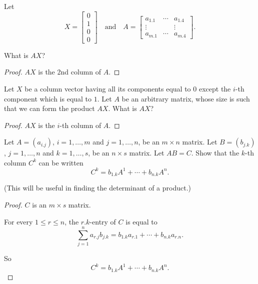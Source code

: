 \begin{exercise}
    Let
    \[
        X = \begin{bmatrix}0 \\ 1 \\ 0 \\ 0\end{bmatrix}
        \quad\text{and}\quad
        A = \begin{bmatrix}
            a_{1.1} & \cdots & a_{1.4} \\
            \vdots  &        & \vdots  \\
            a_{m.1} & \cdots & a_{m.4}
        \end{bmatrix}.
    \]

    What is $AX$?
\end{exercise}

\begin{proof}
    $AX$ is the 2nd column of $A$.
\end{proof}

\begin{exercise}
    Let $X$ be a column vector having all its components equal to $0$ except the $i$-th component which is equal to $1$. Let $A$ be an arbitrary matrix, whose size is such that we can form the product $AX$. What is $AX$?
\end{exercise}

\begin{proof}
    $AX$ is the $i$-th column of $A$.
\end{proof}

\begin{exercise}
    Let $A = {(a_{i.j})}$, $i = 1,\ldots, m$ and $j = 1,\ldots, n$, be an $m\times n$ matrix. Let $B = {(b_{j.k})}$, $j = 1,\ldots, n$ and $k = 1,\ldots, s$, be an $n\times s$ matrix. Let $AB = C$. Show that the $k$-th column $C^{k}$ can be written
    \[
        C^{k} = b_{1.k}A^{1} + \cdots + b_{n.k}A^{n}.
    \]

    (This will be useful in finding the determinant of a product.)
\end{exercise}

\begin{proof}
    $C$ is an $m\times s$ matrix.

    For every $1\le r\le n$, the $r.k$-entry of $C$ is equal to
    \[
        \sum^{n}_{j=1}a_{r.j}b_{j.k} = b_{1.k}a_{r.1} + \cdots + b_{n.k}a_{r.n}.
    \]

    So
    \[
        C^{k} = b_{1.k}A^{1} + \cdots + b_{n.k}A^{n}.
    \]
\end{proof}

